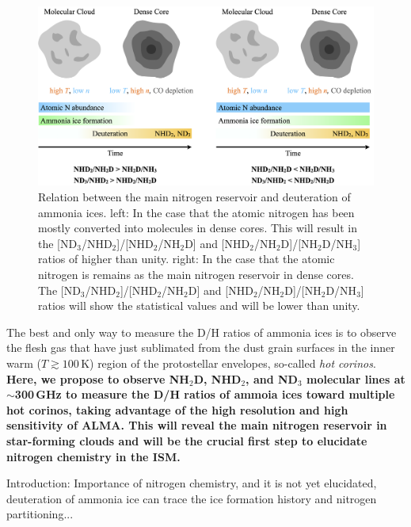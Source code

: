 \documentclass[12pt,a4paper]{article}  %
\begin{document}
\begin{figure}[th]
    \centering
    \includegraphics[width=\textwidth]{ammonia_deuteration_cartoon.png}
    \caption{Relation between the main nitrogen reservoir and deuteration of ammonia ices. left: In the case that the atomic nitrogen has been mostly converted into molecules in dense cores. This will result in the [ND$_3$/NHD$_2$]/[NHD$_2$/NH$_2$D] and [NHD$_2$/NH$_2$D]/[NH$_2$D/NH$_3$] ratios of higher than unity. right: In the case that the atomic nitrogen is remains as the main nitrogen reservoir in dense cores. The [ND$_3$/NHD$_2$]/[NHD$_2$/NH$_2$D] and [NHD$_2$/NH$_2$D]/[NH$_2$D/NH$_3$] ratios will show the statistical values and will be lower than unity.}
    \label{fig:my_label}
\end{figure}

\smallskip
\noindent The best and only way to measure the D/H ratios of ammonia ices is to observe the flesh gas that have just sublimated from the dust grain surfaces in the inner warm ($T\gtrsim100$\,K) region of the protostellar envelopes, so-called \textit{hot corinos}. \textbf{Here, we propose to observe NH$_2$D, NHD$_2$, and ND$_3$ molecular lines at $\sim$300\,GHz to measure the D/H ratios of ammoia ices toward multiple hot corinos, taking advantage of the high resolution and high sensitivity of ALMA. This will reveal the main nitrogen reservoir in star-forming clouds and will be the crucial first step to elucidate nitrogen chemistry in the ISM.}





\color{red}
Introduction: Importance of nitrogen chemistry, and it is not yet elucidated, deuteration of ammonia ice can trace the ice formation history and nitrogen partitioning...
\end{document}
